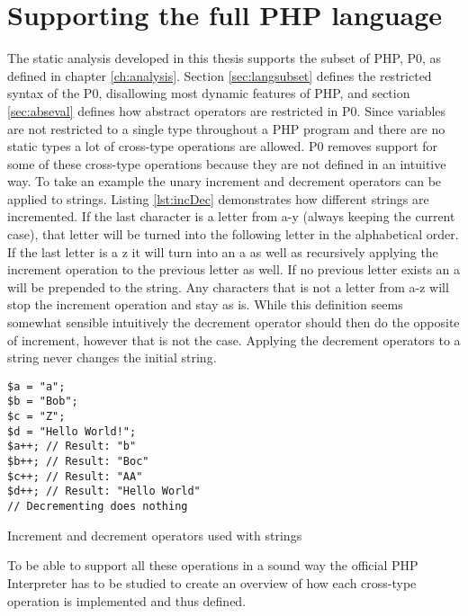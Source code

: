 \section{Supporting the full PHP language}
The static analysis developed in this thesis supports the subset of PHP, P0, as defined in chapter \ref{ch:analysis}.
Section \ref{sec:langsubset} defines the restricted syntax of the P0, disallowing most dynamic features of PHP, and section \ref{sec:abseval} defines how abstract operators are restricted in P0. Since variables are not restricted to a single type throughout a PHP program and there are no static types a lot of cross-type operations are allowed. P0 removes support for some of these cross-type operations because they are not defined in an intuitive way. To take an example the unary increment and decrement operators can be applied to strings. Listing \ref{lst:incDec} demonstrates how different strings are incremented. If the last character is a letter from a-y (always keeping the current case), that letter will be turned into the following letter in the alphabetical order. If the last letter is a z it will turn into an a as well as recursively applying the increment operation to the previous letter as well. If no previous letter exists an a will be prepended to the string. Any characters that is not a letter from a-z will stop the increment operation and stay as is. While this definition seems somewhat sensible intuitively the decrement operator should then do the opposite of increment, however that is not the case. Applying the decrement operators to a string never changes the initial string.

\begin{program}
\begin{lstlisting}
$a = "a";
$b = "Bob";
$c = "Z";
$d = "Hello World!";
$a++; // Result: "b"
$b++; // Result: "Boc"
$c++; // Result: "AA"
$d++; // Result: "Hello World"
// Decrementing does nothing
\end{lstlisting}
\caption{Increment and decrement operators used with strings}
\label{lst:incDec}
\end{program}

To be able to support all these operations in a sound way the official PHP Interpreter has to be studied to create an overview of how each cross-type operation is implemented and thus defined.  


